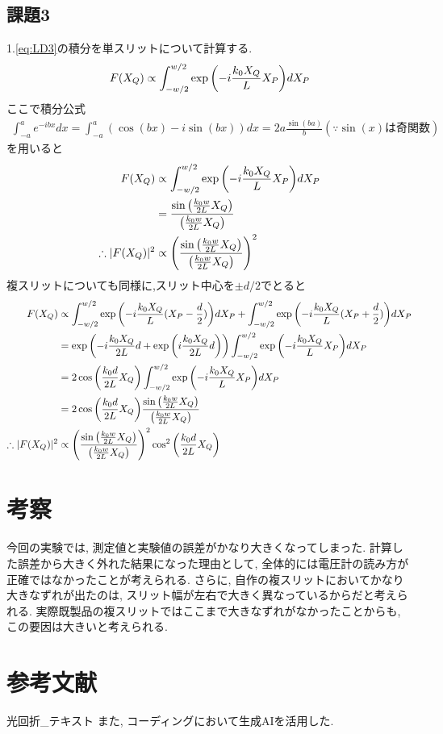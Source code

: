 \documentclass[11pt]{ltjsarticle}
\begin{document}
      \subsection*{課題3}
        1.\cref{eq:LD3}の積分を単スリットについて計算する.
        \begin{align*}
          F(X_Q) &\propto \int_{-w/2}^{w/2} \exp\qty(-i\frac{k_0 X_Q}{L}X_P)dX_P\\
        \end{align*}
        ここで積分公式
        \begin{align*}
          \int_{-a}^{a} e^{-ibx}dx = \int_{-a}^{a} (\cos(bx) - i\sin(bx))dx = 2a\frac{\sin(ba)}{b}(\because \sin(x)\text{は奇関数})
          \label{eq:integral}
        \end{align*}
        を用いると
        \begin{align*}
          F(X_Q) &\propto \int_{-w/2}^{w/2} \exp\qty(-i\frac{k_0 X_Q}{L}X_P)dX_P\\
                 &=\frac{\sin\qty(\frac{k_0 w}{2L}X_Q)}{\qty(\frac{k_0 w}{2L}X_Q)}\\
          \therefore |F(X_Q)|^2 &\propto \qty(\frac{\sin\qty(\frac{k_0 w}{2L}X_Q)}{\qty(\frac{k_0 w}{2L}X_Q)})^2
        \end{align*}
        複スリットについても同様に,スリット中心を$\pm d/2$でとると
        \begin{align*}
          F(X_Q) &\propto \int_{-w/2}^{w/2} \exp\qty(-i\frac{k_0 X_Q}{L}(X_P-\frac{d}{2}))dX_P+\int_{-w/2}^{w/2} \exp\qty(-i\frac{k_0 X_Q}{L}(X_P+\frac{d}{2}))dX_P\\
                 &=\exp\qty(-i\frac{k_0 X_Q}{2L}d+\exp\qty(i\frac{k_0 X_Q}{2L}d))\int_{-w/2}^{w/2} \exp\qty(-i\frac{k_0 X_Q}{L}X_P)dX_P\\
                  &=2\cos\qty(\frac{k_0 d}{2L}X_Q)\int_{-w/2}^{w/2} \exp\qty(-i\frac{k_0 X_Q}{L}X_P)dX_P\\
                  &=2\cos\qty(\frac{k_0 d}{2L}X_Q)\frac{\sin\qty(\frac{k_0 w}{2L}X_Q)}{\qty(\frac{k_0 w}{2L}X_Q)}\\
          \therefore |F(X_Q)|^2 &\propto \qty(\frac{\sin\qty(\frac{k_0 w}{2L}X_Q)}{\qty(\frac{k_0 w}{2L}X_Q)})^2\cos^2\qty(\frac{k_0 d}{2L}X_Q)
        \end{align*}
  \section*{考察}
    今回の実験では, 測定値と実験値の誤差がかなり大きくなってしまった. 計算した誤差から大きく外れた結果になった理由として, 全体的には電圧計の読み方が正確ではなかったことが考えられる. さらに, 自作の複スリットにおいてかなり大きなずれが出たのは, スリット幅が左右で大きく異なっているからだと考えられる. 実際既製品の複スリットではここまで大きなずれがなかったことからも, この要因は大きいと考えられる. 
  \section*{参考文献}
   光回折\_テキスト
   また, コーディングにおいて生成AIを活用した. 
\end{document}
